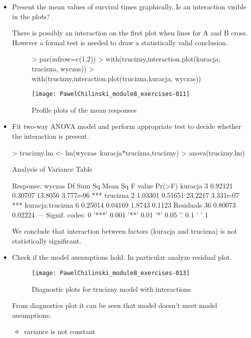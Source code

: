 \documentclass[a4paper]{article}
\begin{document}
\begin{itemize}
  \item Present the mean values of survival times graphically. Is an interaction
  visible in the plots?
  
There is possibly an interaction on the first plot when lines for A and B cross. However a formal test is needed to
draw a statistically valid conclusion.
\begin{figure}[H]
\begin{center}
\begin{Schunk}
\begin{Sinput}
> par(mfrow=c(1,2))
> with(trucizny,interaction.plot(kuracja, trucizna, wyczas))
> with(trucizny,interaction.plot(trucizna,kuracja, wyczas))
\end{Sinput}
\end{Schunk}
\texttt{[image: PawelChilinski\_module8\_exercises-011]}
\caption{Profile plots of the mean responses}
\label{TRUC_INT_PLOT}
\end{center}
\end{figure}

  \item Fit two-way ANOVA model and perform appropriate test to decide whether
  the interaction is present.
\begin{Schunk}
\begin{Sinput}
> trucizny.lm <- lm(wyczas~kuracja*trucizna,trucizny)	
> anova(trucizny.lm)
\end{Sinput}
\begin{Soutput}
Analysis of Variance Table

Response: wyczas
                 Df  Sum Sq Mean Sq F value    Pr(>F)    
kuracja           3 0.92121 0.30707 13.8056 3.777e-06 ***
trucizna          2 1.03301 0.51651 23.2217 3.331e-07 ***
kuracja:trucizna  6 0.25014 0.04169  1.8743    0.1123    
Residuals        36 0.80073 0.02224                      
---
Signif. codes:  0 '***' 0.001 '**' 0.01 '*' 0.05 '.' 0.1 ' ' 1
\end{Soutput}
\end{Schunk}
We conclude that interaction between factors (kuracja and trucizna) is not
statistically significant.
  \item Check if the model assumptions hold. In particular analyze residual
  plot.
  
\begin{figure}[H]
\begin{center}
\texttt{[image: PawelChilinski\_module8\_exercises-013]}
\caption{Diagnostic plots for trucizny model with interactions}
\end{center}
\end{figure}
From diagnostics plot it can be seen that model doesn't meet model assumptions:	
  \begin{itemize}
    \item variance is not constant
    

\end{itemize}
\end{itemize}
\end{document}
